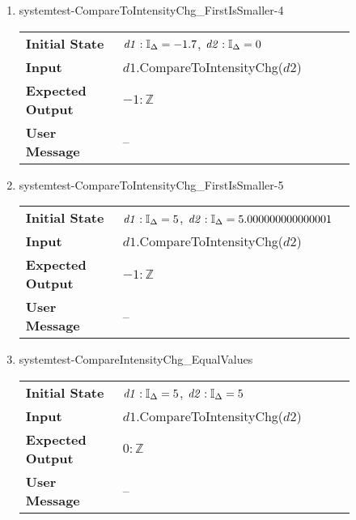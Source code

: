 \begin{enumerate}
    \item{systemtest-CompareToIntensityChg\_FirstIsSmaller-4}
    \begin{table}[H]
        \centering
        \begin{tabular}{P{0.25\linewidth}P{0.6\linewidth}}
            \toprule
            \textbf{Initial State} & $\mathit{d1} : \mathbb{I}_{\Delta} = -1.7$,
            $\mathit{d2} : \mathbb{I}_{\Delta} = 0$ \\
            \textbf{Input} & $\mathit{d1}$.CompareToIntensityChg($\mathit{d2}$)
            \\ \midrule
            \textbf{Expected Output} & $-1 : \mathbb{Z}$ \\
            \textbf{User Message} & -- \\ \bottomrule
        \end{tabular}
    \end{table}

    \item{systemtest-CompareToIntensityChg\_FirstIsSmaller-5}
    \begin{table}[H]
        \centering
        \begin{tabular}{P{0.25\linewidth}P{0.6\linewidth}}
            \toprule
            \textbf{Initial State} & $\mathit{d1} : \mathbb{I}_{\Delta} = 5$,
            $\mathit{d2} : \mathbb{I}_{\Delta} = 5.000000000000001$ \\
            \textbf{Input} & $\mathit{d1}$.CompareToIntensityChg($\mathit{d2}$)
            \\ \midrule
            \textbf{Expected Output} & $-1 : \mathbb{Z}$ \\
            \textbf{User Message} & -- \\ \bottomrule
        \end{tabular}
    \end{table}

    \item{systemtest-CompareIntensityChg\_EqualValues}
    \begin{table}[H]
        \centering
        \begin{tabular}{P{0.25\linewidth}P{0.6\linewidth}}
            \toprule
            \textbf{Initial State} & $\mathit{d1} : \mathbb{I}_{\Delta} = 5$,
            $\mathit{d2} : \mathbb{I}_{\Delta} = 5$ \\
            \textbf{Input} & $\mathit{d1}$.CompareToIntensityChg($\mathit{d2}$)
            \\ \midrule
            \textbf{Expected Output} & $0 : \mathbb{Z}$ \\
            \textbf{User Message} & -- \\ \bottomrule
        \end{tabular}
    \end{table}



\end{enumerate}
